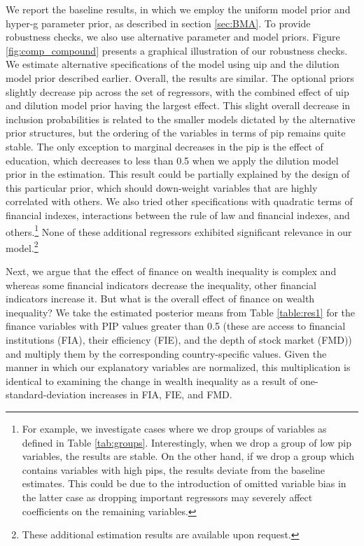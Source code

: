 \documentclass[a4paper,11pt]{article}
\begin{document}
We report the baseline results, in which we employ the uniform model prior and hyper-g parameter prior, as described in section \ref{sec:BMA}. To provide robustness checks, we also use alternative parameter and model priors. Figure \ref{fig:comp_compound} presents a graphical illustration of our robustness checks. We estimate alternative specifications of the model using \ac{uip} and the dilution model prior described earlier. Overall, the results are similar. The optional priors slightly decrease \ac{pip} across the set of regressors, with the combined effect of \ac{uip} and dilution model prior having the largest effect. This slight overall decrease in inclusion probabilities is related to the smaller models dictated by the alternative prior structures, but the ordering of the variables in terms of \ac{pip} remains quite stable. The only exception to marginal decreases in the \ac{pip} is the effect of education, which decreases to less than 0.5 when we apply the dilution model prior in the estimation. This result could be partially explained by the design of this particular prior, which should down-weight variables that are highly correlated with others. We also tried other specifications with quadratic terms of financial indexes, interactions between the rule of law and financial indexes, and others.\footnote{For example, we investigate cases where we drop groups of variables as defined in Table \ref{tab:groups}. Interestingly, when we drop a group of low \ac{pip} variables, the results are stable. On the other hand, if we drop a group which contains variables with high \ac{pip}s, the results deviate from the baseline estimates. This could be due to the introduction of omitted variable bias in the latter case as dropping important regressors may severely affect coefficients on the remaining variables.} None of these additional regressors exhibited significant relevance in our model.\footnote{These additional estimation results are available upon request.}

Next, we argue that the effect of finance on wealth inequality is complex and whereas some financial indicators decrease the inequality, other financial indicators increase it. But what is the overall effect of finance on wealth inequality? We take the estimated posterior means from Table \ref{table:res1} for the finance variables with PIP values greater than 0.5 (these are access to financial institutions (FIA), their efficiency (FIE), and the depth of stock market (FMD)) and multiply them by the corresponding country-specific values. Given the manner in which our explanatory variables are normalized, this multiplication is identical to examining the change in wealth inequality as a result of one-standard-deviation increases in FIA, FIE, and FMD. 
\end{document}
